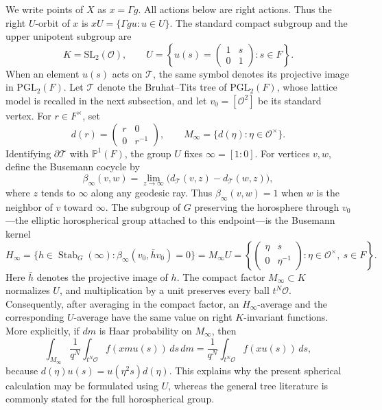 \documentclass[11pt]{amsart}
\theoremstyle{definition}
\theoremstyle{plain}
\newcommand{\cO}{\mathcal O}
\newcommand{\Tree}{\mathcal T}
\begin{document}
We write points of \(X\) as \(x=\Gamma g\).  All actions below are right actions.
Thus the right \(U\)-orbit of \(x\) is \(xU=\{\Gamma gu:u\in U\}\).  The standard
compact subgroup and the upper unipotent subgroup are
\[
K=\mathrm{SL}_2(\cO),
\qquad
U=\left\{u(s)=\begin{pmatrix}1&s\\0&1\end{pmatrix}:s\in F\right\}.
\]
When an element \(u(s)\) acts on \(\Tree\), the same symbol denotes its
projective image in \(\mathrm{PGL}_2(F)\).
Let \(\Tree\) denote the Bruhat--Tits tree of \(\mathrm{PGL}_2(F)\), whose
lattice model is recalled in the next subsection, and let \(v_0=[\cO^2]\) be
its standard vertex.
For \(r\in F^\times\), set
\[
d(r)=\begin{pmatrix}r&0\\0&r^{-1}\end{pmatrix},
\qquad
M_\infty=\{d(\eta):\eta\in\cO^\times\}.
\]
Identifying \(\partial\Tree\) with \(\mathbb P^1(F)\), the group \(U\) fixes
\(\infty=[1:0]\).  For vertices \(v,w\), define the Busemann cocycle by
\[
\beta_\infty(v,w)
 =\lim_{z\to\infty}\bigl(d_\Tree(v,z)-d_\Tree(w,z)\bigr),
\]
where \(z\) tends to \(\infty\) along any geodesic ray.  Thus
\(\beta_\infty(v,w)=1\) when \(w\) is the neighbor of \(v\) toward
\(\infty\).  The subgroup of \(G\) preserving the horosphere through
\(v_0\)---the elliptic horospherical group attached to this endpoint---is the
Busemann kernel
\[
H_\infty
 =\{h\in\operatorname{Stab}_G(\infty):
       \beta_\infty(v_0,\bar h v_0)=0\}
 =M_\infty U
 =\left\{\begin{pmatrix}\eta&s\\0&\eta^{-1}\end{pmatrix}:
          \eta\in\cO^\times,\ s\in F\right\}.
\]
Here \(\bar h\) denotes the projective image of \(h\).
The compact factor \(M_\infty\subset K\) normalizes \(U\), and multiplication
by a unit preserves every ball \(t^N\cO\).  Consequently, after averaging in
the compact factor, an \(H_\infty\)-average and the corresponding \(U\)-average
have the same value on right \(K\)-invariant functions.  More explicitly, if
\(dm\) is Haar probability on \(M_\infty\), then
\[
\int_{M_\infty}\frac1{q^N}\int_{t^N\cO}f(xm u(s))\,ds\,dm
 =\frac1{q^N}\int_{t^N\cO}f(xu(s))\,ds,
\]
because \(d(\eta)u(s)=u(\eta^2s)d(\eta)\).  This explains why the
present spherical calculation may be formulated using \(U\), whereas the
general tree literature is commonly stated for the full horospherical group.
\end{document}

